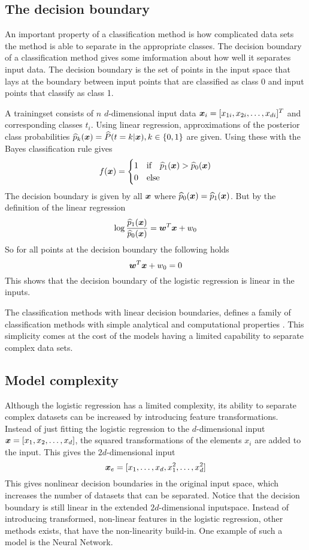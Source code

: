 \subsection{The decision boundary}
An important property of a classification method is how complicated data sets the method is able to separate in the appropriate classes. The decision boundary of a classification method gives some imformation about how well it separates input data. The decision boundary is the set of points in the input space that lays at the boundary between input points that are classified as class 0 and input points that classify as class 1.
\begin{Exa}
    A trainingset consists of $n$ $d$-dimensional input data $\boldsymbol{x}_i=[x_{1i}, x_{2i}, \dots, x_{di}]^T$ and corresponding classes $t_i$. Using linear regression, approximations of the posterior class probabilities $\widehat{p}_k(\boldsymbol{x})=\widehat{P}(t=k|\boldsymbol{x}), k\in\{0,1\}$ are given. Using these with the Bayes classification rule gives
    \[
        f(\boldsymbol{x}) = \begin{cases}
            1 & \text{if}\quad \widehat{p}_1(\boldsymbol{x})>\widehat{p}_0(\boldsymbol{x}) \\
            0 & \text{else}
        \end{cases}
    \]
    The decision boundary is given by all $\boldsymbol{x}$ where $\widehat{p}_0(\boldsymbol{x})=\widehat{p}_1(\boldsymbol{x})$. But by the definition of the linear regression
    \[
        \log\frac{\widehat{p}_1(\boldsymbol{x})}{\widehat{p}_0(\boldsymbol{x})} = \boldsymbol{w}^T\boldsymbol{x}+w_0
    \]
    So for all points at the decision boundary the following holds
    \[
        \boldsymbol{w}^T\boldsymbol{x}+w_0 = 0
    \]
    This shows that the decision boundary of the logistic regression is linear in the inputs.
\end{Exa}
The classification methods with linear decision boundaries, defines a family of classification methods with simple analytical and computational properties \citep[p.179]{bishop}. This simplicity comes at the cost of the models having a limited capability to separate complex data sets. 

\subsection{Model complexity}\label{sec:logistic-complexity}
Although the logistic regression has a limited complexity, its ability to separate complex datasets can be increased by introducing feature transformations. Instead of just fitting the logistic regression to the $d$-dimensional input $\boldsymbol{x}=[x_1, x_2, \dots, x_d]$, the squared transformations of the elements $x_i$ are added to the input. This gives the $2d$-dimensional input 
\[
    \boldsymbol{x}_e = [x_1, \dots, x_d, x_1^2, \dots, x_d^2]
\]
This gives nonlinear decision boundaries in the original input space, which increases the number of datasets that can be separated. Notice that the decision boundary is still linear in the extended $2d$-dimensional inputspace. Instead of introducing transformed, non-linear features in the logistic regression, other methods exists, that have the non-linearity build-in. One example of such a model is the Neural Network.


